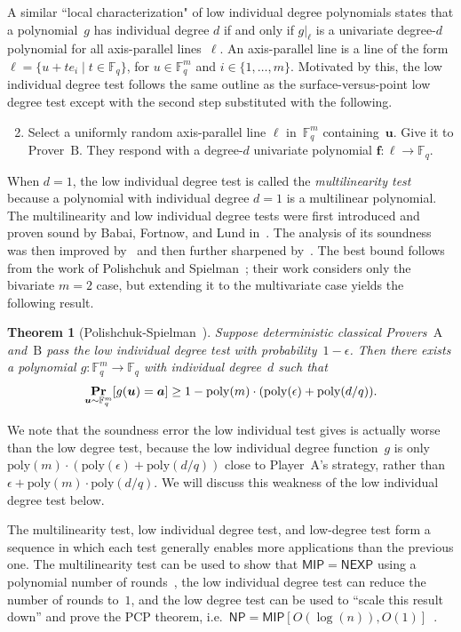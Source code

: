\documentclass[11pt]{article}
\newtheorem{theorem}{Theorem}[section]
\theoremstyle{definition}
\renewcommand{\Pr}{\mathop{\bf Pr\/}}
\newcommand{\poly}{\mathrm{poly}}
\newcommand{\F}{\mathbb F}
\newcommand{\NP}{\mathsf{NP}}
\newcommand{\NEXP}{\mathsf{NEXP}}
\newcommand{\MIP}{\mathsf{MIP}}
\newcommand{\eps}{\epsilon}
\newcommand{\ba}{\boldsymbol{a}}
\newcommand{\boldf}{\boldsymbol{f}}
\newcommand{\bell}{\boldsymbol{\ell}}
\newcommand{\bu}{\boldsymbol{u}}
\begin{document}
A similar ``local characterization" of low individual degree polynomials states that a polynomial~$g$ has individual degree $d$
if and only if $g|_{\ell}$ is a univariate degree-$d$ polynomial for all axis-parallel lines~$\ell$.
An axis-parallel line is a line of the form
$\ell = \{u+t e_i \mid t \in \F_q\}$, for $u \in \F_q^m$ and
$i \in \{1, \ldots, m\}$.
Motivated by this, the low individual degree test follows the same outline as the surface-versus-point low degree test
except with the second step substituted with the following.
\begin{enumerate}
\setcounter{enumi}{1}
\item Select a uniformly random axis-parallel line $\bell$ in~$\F_q^m$ containing~$\bu$.
	Give it to Prover~$\mathrm{B}$. They respond with a degree-$d$ univariate polynomial $\boldf:\bell\rightarrow \F_q$.
\end{enumerate}
When $d = 1$, the low individual degree test
is called the \emph{multilinearity test} because a polynomial with individual degree $d = 1$ is a multilinear polynomial.
The multilinearity  and low individual degree tests were
first introduced and proven sound by Babai, Fortnow, and Lund in~\cite{BFL91}.
The analysis of its soundness was then improved by~\cite{AS98} and then further sharpened by~\cite{FHS94}.
The best bound follows from the work of Polishchuk and Spielman~\cite{PS94};
their work considers only the bivariate $m = 2$ case,
but extending it to the multivariate case yields the following result.
\begin{theorem}[Polishchuk-Spielman~\cite{PS94}]\label{thm:classical-test-soundness}
Suppose deterministic classical Provers~$\mathrm{A}$ and~$\mathrm{B}$ pass the low individual degree test with probability~$1-\eps$.
Then there exists a polynomial $g:\F_q^m \rightarrow \F_q$ with individual degree~$d$ such that
\begin{equation*}
\Pr_{\bu \sim \F_q^m}[g(\bu) = \ba] \geq 1 -  \poly(m) \cdot (\poly(\eps) + \poly(d/q)).
\end{equation*}
\end{theorem}
We note that the soundness error the low individual test gives is actually worse than the low degree test,
because the low individual degree function~$g$ is only $\poly(m) \cdot (\poly(\eps) + \poly(d/q))$ close to Player~$\mathrm{A}$'s strategy,
rather than $\eps + \poly(m) \cdot \poly(d/q)$.
We will discuss this weakness of the low individual degree test below.

The multilinearity test, low individual degree test, and low-degree test
form a sequence
in which each test generally enables more applications than the previous one.
The multilinearity test can be used to show that $\MIP = \NEXP$ using a polynomial number of rounds~\cite{BFL91},
the low individual degree test can reduce the number of rounds to~$1$,
and the low degree test can be used to ``scale this result down''
and prove the PCP theorem, i.e.\ $\NP = \MIP[O(\log(n)), O(1)]$~\cite{AS98,ALM+98}.
\end{document}
